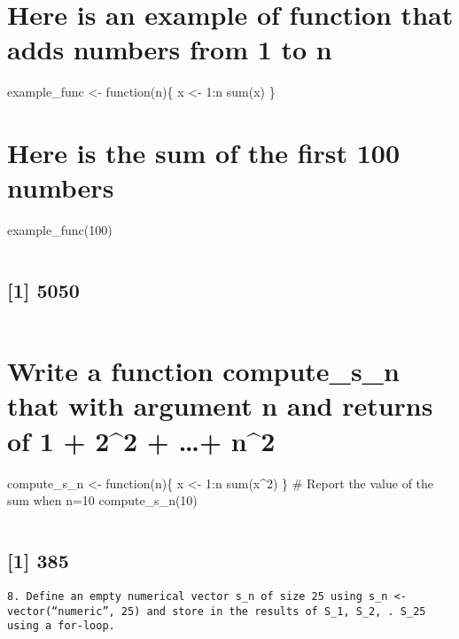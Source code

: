 \documentclass[
]{article}
\begin{document}
\hypertarget{here-is-an-example-of-function-that-adds-numbers-from-1-to-n}{%
\section{Here is an example of function that adds numbers from 1 to
n}\label{here-is-an-example-of-function-that-adds-numbers-from-1-to-n}}

example\_func \textless- function(n)\{ x \textless- 1:n sum(x) \}

\hypertarget{here-is-the-sum-of-the-first-100-numbers}{%
\section{Here is the sum of the first 100
numbers}\label{here-is-the-sum-of-the-first-100-numbers}}

example\_func(100)

\begin{verbatim}
\end{verbatim}

\hypertarget{section-5}{%
\subsection{{[}1{]} 5050}\label{section-5}}

\begin{verbatim}
\end{verbatim}

\hypertarget{write-a-function-compute_s_n-that-with-argument-n-and-returns-of-1-22-n2}{%
\section{Write a function compute\_s\_n that with argument n and returns
of 1 + 2\^{}2 + \ldots+
n\^{}2}\label{write-a-function-compute_s_n-that-with-argument-n-and-returns-of-1-22-n2}}

compute\_s\_n \textless- function(n)\{ x \textless- 1:n sum(x\^{}2) \}
\# Report the value of the sum when n=10 compute\_s\_n(10)

\begin{verbatim}
\end{verbatim}

\hypertarget{section-6}{%
\subsection{{[}1{]} 385}\label{section-6}}

\begin{verbatim}
8. Define an empty numerical vector s_n of size 25 using s_n <- vector(“numeric”, 25) and store in the results of S_1, S_2, . S_25 using a for-loop.
\end{verbatim}
\end{document}
